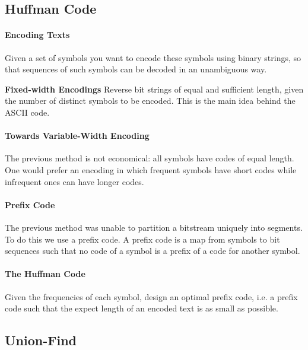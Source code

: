 \subsection{Huffman Code}
\paragraph{Encoding Texts}
Given a set of symbols you want to encode these symbols using binary strings, so that 
sequences of such symbols can be decoded in an unambiguous way.

\textbf{Fixed-width Encodings} Reverse bit strings of equal and sufficient length, given
the number of distinct symbols to be encoded. This is the main idea behind the ASCII code.

\paragraph{Towards Variable-Width Encoding}
The previous method is not economical: all symbols have codes of equal length. 
One would prefer an encoding in which frequent symbols have short codes
while infrequent ones can have longer codes.

\paragraph{Prefix Code}
The previous method was unable to partition a bitstream uniquely into segments.
To do this we use a prefix code. A prefix code is a map from symbols to bit sequences
such that no code of a symbol is a prefix of a code for another symbol.

\paragraph{The Huffman Code} 
Given the frequencies of each symbol, design an optimal prefix code, i.e. a prefix code 
such that the expect length of an encoded text is as small as possible. 

\subsection{Union-Find}

